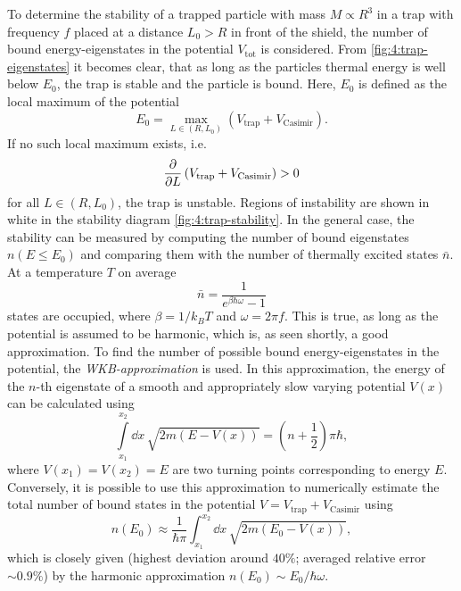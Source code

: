 To determine the stability of a trapped particle with mass $M \propto R^3$ in a trap with frequency $f$ placed at a distance $L_0 > R$ in front of the shield, the number of bound energy-eigenstates in the potential $V_\mathrm{tot}$ is considered.
From \cref{fig:4:trap-eigenstates} it becomes clear, that as long as the particles thermal energy is well below $E_0$, the trap is stable and the particle is bound.
Here, $E_0$ is defined as the local maximum of the potential 
\begin{equation}
  E_0 = \max_{L\in(R,L_0)} \left( V_\mathrm{trap} + V_\mathrm{Casimir} \right) .
\end{equation}
If no such local maximum exists, i.e.
\begin{equation}
  \pdv{L} \left( V_\mathrm{trap} + V_\mathrm{Casimir} \right) > 0
\end{equation}
for all $L \in (R, L_0)$, the trap is unstable.
Regions of instability are shown in white in the stability diagram \cref{fig:4:trap-stability}.
In the general case, the stability can be measured by computing the number of bound eigenstates $n(E \leq E_0)$ and comparing them with the number of thermally excited states $\bar{n}$.
At a temperature $T$ on average 
\begin{equation}
  \bar{n} = \frac{1}{e^{\beta \hbar \omega} - 1}
\end{equation}
states are occupied, where $\beta = 1/k_B T$ and $\omega = 2\pi f$. This is true, as long as the potential is assumed to be harmonic, which is, as seen shortly, a good approximation.
To find the number of possible bound energy-eigenstates in the potential, the \emph{WKB-approximation} is used.
In this approximation, the energy of the $n$-th eigenstate of a smooth and appropriately slow varying potential $V(x)$ can be calculated using \cite[p. 163]{Schleich_2001}
\begin{equation}
  \int\limits_{x_1}^{x_2} \dd x \, \sqrt{2m(E-V(x))} = \left(n + \frac{1}{2}\right)\pi\hbar ,
\end{equation}
where $V(x_1) = V(x_2) = E$ are two turning points corresponding to energy $E$.
Conversely, it is possible to use this approximation to numerically estimate the total number of bound states in the potential $V = V_\mathrm{trap} + V_\mathrm{Casimir}$ using
\begin{equation}
  n(E_0) \approx \frac{1}{\hbar \pi} \int_{x_1}^{x_2} \dd x \, \sqrt{2m(E_0 - V(x))},
\end{equation}
which is closely given (highest deviation around $40\%$; averaged relative error $\sim 0.9\%$) by the harmonic approximation $n(E_0) \sim E_0 / \hbar \omega$.

